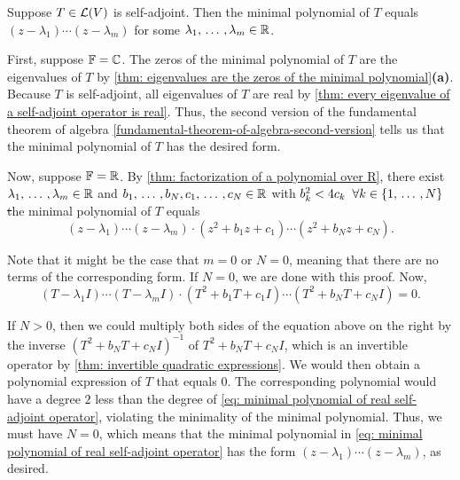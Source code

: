 \begin{thm}
  \label{thm: minimal polynomial of self-adjoint operator}
  Suppose $T \in \mathcal{L}(V)$ is self-adjoint. Then the minimal polynomial of $T$ equals $(z-\lambda_1) \cdots (z-\lambda_m)$ for some $\lambda_1, {\, \ldots \,\,}, \lambda_m \in \mathbb{R}$.
\end{thm}
\begin{prf}
  First, suppose $\mathbb{F} = \mathbb{C}$. The zeros of the minimal polynomial of $T$ are the eigenvalues of $T$ by \ref{thm: eigenvalues are the zeros of the minimal polynomial}\textbf{(a)}. Because $T$ is self-adjoint, all eigenvalues of $T$ are real by \ref{thm: every eigenvalue of a self-adjoint operator is real}. Thus, the second version of the fundamental theorem of algebra \ref{fundamental-theorem-of-algebra-second-version} tells us that the minimal polynomial of $T$ has the desired form.

  Now, suppose $\mathbb{F} = \mathbb{R}$. By \ref{thm: factorization of a polynomial over R}, there exist $\lambda_1, {\, \ldots \,\,}, \lambda_m \in \mathbb{R}$ and $b_1, {\, \ldots \,\,}, b_N, c_1, {\, \ldots \,\,}, c_N \in \mathbb{R}$ with $b_k^2 < 4c_k \; \; \forall k \in \{1, {\, \ldots \,\,}, N \}$ \st the minimal polynomial of $T$ equals
  \begin{equation}
    \label{eq: minimal polynomial of real self-adjoint operator}
    (z-\lambda_1)\cdots(z-\lambda_m)\cdot(z^2+b_1z+c_1) \cdots (z^2+b_Nz+c_N).
  \end{equation}

  Note that it might be the case that $m=0$ or $N=0$, meaning that there are no terms of the corresponding form. If $N=0$, we are done with this proof. Now,
  \[
  (T-\lambda_1I) \cdots (T-\lambda_m I)\cdot(T^2 + b_1 T + c_1I)\cdots(T^2 + b_NT + c_NI) = 0.
  \]

  If $N>0$, then we could multiply both sides of the equation above on the right by the inverse $(T^2+b_NT+c_NI)^{-1}$ of $T^2+b_NT+c_NI$, which is an invertible operator by \ref{thm: invertible quadratic expressions}. We would then obtain a polynomial expression of $T$ that equals $0$. The corresponding polynomial would have a degree $2$ less than the degree of \eqref{eq: minimal polynomial of real self-adjoint operator}, violating the minimality of the minimal polynomial. Thus, we must have $N=0$, which means that the minimal polynomial in \eqref{eq: minimal polynomial of real self-adjoint operator} has the form $(z-\lambda_1)\cdots(z-\lambda_m)$, as desired.
\end{prf}

